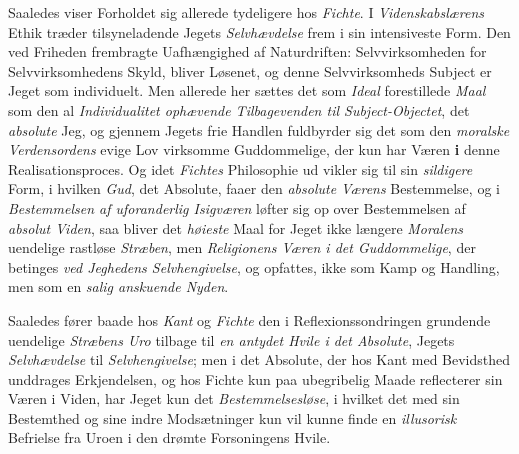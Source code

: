 Saaledes viser Forholdet sig allerede tydeligere hos \emph{Fichte}.
I \emph{Videnskabslærens} Ethik træder tilsyneladende Jegets
\emph{Selvhævdelse} frem i sin intensiveste Form. Den ved Friheden
frembragte Uafhængighed af Naturdriften: Selvvirksomheden
for Selvvirksomhedens Skyld, bliver Løsenet, og denne
Selvvirksomheds Subject er Jeget som individuelt. Men allerede
her sættes det som \emph{Ideal} forestillede \emph{Maal} som den al
\emph{Individualitet ophævende Tilbagevenden til Subject-Objectet},
det \emph{absolute} Jeg, og gjennem Jegets frie
Handlen fuldbyrder sig det som den \emph{moralske Verdensordens}
evige Lov virksomme Guddommelige, der kun har Væren
\textbf{i} denne Realisationsproces. Og idet \emph{Fichtes} Philosophie ud
 vikler sig til sin \emph{sildigere} Form, i hvilken \emph{Gud}, det Absolute,
faaer den \emph{absolute Værens} Bestemmelse, og i \emph{Bestemmelsen
af uforanderlig Isigværen} løfter sig op over
Bestemmelsen af \emph{absolut Viden}, saa bliver det \emph{høieste}
Maal for Jeget ikke længere \emph{Moralens} uendelige rastløse
\emph{Stræben}, men \emph{Religionens Væren i det Guddommelige},
der betinges \emph{ved Jeghedens Selvhengivelse}, og opfattes,
ikke som Kamp og Handling, men som en \emph{salig anskuende
Nyden}.

Saaledes fører baade hos \emph{Kant} og \emph{Fichte} den i Reflexionssondringen
grundende uendelige \emph{Stræbens Uro} tilbage
til \emph{en antydet Hvile i det Absolute}, Jegets \emph{Selvhævdelse}
til \emph{Selvhengivelse}; men i det Absolute, der hos Kant med
Bevidsthed unddrages Erkjendelsen, og hos Fichte kun paa
ubegribelig Maade reflecterer sin Væren i Viden, har Jeget
kun det \emph{Bestemmelsesløse}, i hvilket det med sin Bestemthed
og sine indre Modsætninger kun vil kunne finde en \emph{illusorisk}
Befrielse fra Uroen i den drømte Forsoningens Hvile.

